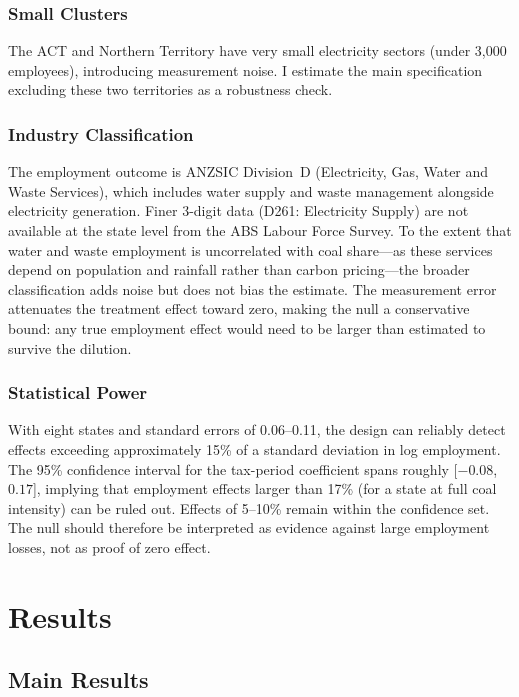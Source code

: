 \documentclass[12pt]{article}
\begin{document}
\subsubsection*{Small Clusters} The ACT and Northern Territory have very small electricity sectors (under 3,000 employees), introducing measurement noise. I estimate the main specification excluding these two territories as a robustness check.

\subsubsection*{Industry Classification} The employment outcome is ANZSIC Division~D (Electricity, Gas, Water and Waste Services), which includes water supply and waste management alongside electricity generation. Finer 3-digit data (D261: Electricity Supply) are not available at the state level from the ABS Labour Force Survey. To the extent that water and waste employment is uncorrelated with coal share---as these services depend on population and rainfall rather than carbon pricing---the broader classification adds noise but does not bias the estimate. The measurement error attenuates the treatment effect toward zero, making the null a conservative bound: any true employment effect would need to be larger than estimated to survive the dilution.

\subsubsection*{Statistical Power} With eight states and standard errors of 0.06--0.11, the design can reliably detect effects exceeding approximately 15\% of a standard deviation in log employment. The 95\% confidence interval for the tax-period coefficient spans roughly [$-0.08$, $0.17$], implying that employment effects larger than 17\% (for a state at full coal intensity) can be ruled out. Effects of 5--10\% remain within the confidence set. The null should therefore be interpreted as evidence against large employment losses, not as proof of zero effect.


\section{Results}
\label{sec:results}

\subsection{Main Results}
\end{document}
